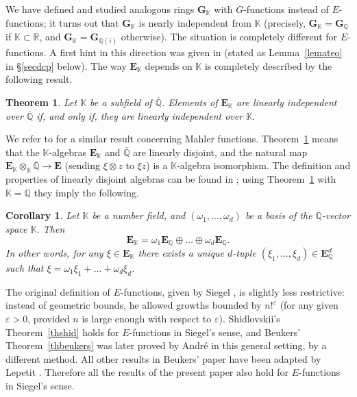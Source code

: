 \documentclass[JEP,XML,SOM,Unicode,published]{cedram}
\newcommand{\Efunctions}{$E$\nobreakdash-func\-tions\xspace}
\newtheorem{theo}{Theorem}
\newtheorem{coro}{Corollary}
\theoremstyle{definition}
\newcommand{\Q}{\mathbb{Q}}
\newcommand{\R}{\mathbb{R}}
\newcommand{\K}{\mathbb{K}}
\newcommand{\GG}{{\mathbf G}}
\newcommand{\EE}{{\mathbf E}}
\newcommand{\Qbar}{\overline{\mathbb Q}}
\newcommand{\EK}{\EE_{\K}}
\newcommand{\EQ}{\EE_{\Q}}
\begin{document}
We have defined and studied \cite{gvalues} analogous rings $\GG_\K$ with $G$-functions instead of \Efunctions; it turns out that $\GG_\K$ is nearly independent from $\K$ (precisely, $\GG_\K= \GG_\Q$ if $\K\subset\R$, and $\GG_\K=\GG_{\Q(i)}$ otherwise). The situation is completely different for \Efunctions. A first hint in this direction was given in \cite[Th.\,4]{ateo} (stated as Lemma~\ref{lemateo} in \S \ref{secdcp} below). The way $\EK$ depends on $\K$ is completely described by the following result.

\begin{theo} \label{theotens} Let $\K$ be a subfield of $\Qbar$.
Elements of $\EK$ are linearly independent over $\Qbar$ if, and only if, they are linearly independent over $\K$.
\end{theo}

We refer to \cite[Th.\,1.7]{AF} for a similar result concerning Mahler functions.
Theorem~\ref{theotens} means that the $\K$-algebras $\EK$ and $\Qbar$ are linearly disjoint, and the natural map $\EK\otimes_\K \Qbar \to \EE $ (sending $\xi\otimes z$ to $\xi z$) is a $\K$-algebra isomorphism.
The definition and properties of linearly disjoint algebras can be found in \cite[Ch.\,V, \S 2, No.\,5]{Bourbaki}; using Theorem~\ref{theotens} with $\K=\Q$ they imply the following.

\begin{coro}\label{cordcp}
Let $\K$ be a number field, and $(\omega_1,\ldots,\omega_d)$ be a basis of the $\Q$-vector space $\K$. Then
\[
\EK = \omega_1 \EQ\oplus \ldots \oplus \omega_d \EQ.
\]
In other words, for any $\xi\in\EK$
there exists a unique $d$-tuple $(\xi_1,\ldots,\xi_d)\in\EQ^d$ such that $\xi = \omega_1\xi_1+\ldots+\omega_d\xi_d$.
\end{coro}

The original definition of \Efunctions, given by Siegel \cite{siegel}, is slightly less restrictive:
instead of geometric bounds,
he allowed growths bounded by $n!^{\varepsilon}$ (for any given $\varepsilon>0$, provided $n$ is large enough with respect to $\varepsilon$).
Shidlovskii's Theorem~\ref{thshid} holds for \Efunctions in Siegel's sense, and
Beukers' Theorem~\ref{thbeukers} was later proved by André \cite{andreasens} in this general setting, by a different method. All other results in Beukers' paper \cite{beukers} have been adapted by Lepetit \cite{lepetit}. Therefore all the results of the present paper also hold for \Efunctions in Siegel's sense.
\end{document}
